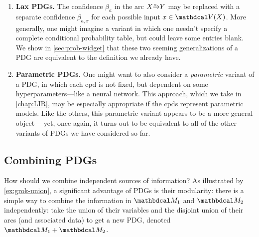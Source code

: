 \begin{enumerate}[wide, label={\textbf{PDG Variant \arabic{*}:}}]
    \item 
    \textbf{Lax PDGs.}
    The confidence $\beta_a$ in the arc $\ed aXY$ may be replaced with a separate confidence $\beta_{a,x}$ for each possible input $x \in \V(X)$. 
    More generally, one might imagine a variant in which one needn't specify a complete conditional probability table, but could leave some entries blank. 
    We show in \cref{sec:prob-widget} that these two seeming generalizations of a PDG are equivalent to the definition we already have. 

    \item 
    \textbf{Parametric PDGs.}
    One might want to also consider a \emph{parametric} variant of a PDG,
		 in which each cpd is not fixed, but dependent on some hyper\-parameters---like a neural network. 
    This approach, which we take in \cref{chap:LIR}, 
		may be especially appropriate if the cpds represent parametric models.
    Like the others, this parametric variant appears to be a more general object---%
	yet, once again, it turns out to be equivalent to all of the other variants of PDGs we have considered so far. 
\end{enumerate}

\subsection{Combining PDGs}
    \label{sec:pdg-combine}

How should we combine independent sources of information? 
%
As illustrated by \cref{ex:grok-union}, a significant advantage of PDGs is their modularity:
there is a simple way to combine the information in $\dg M_1$ and $\dg M_2$ 
independently: take the union of their variables and the disjoint union of their arcs (and associated data) to get a new PDG, denoted $\dg M_1 + \dg M_2$.

